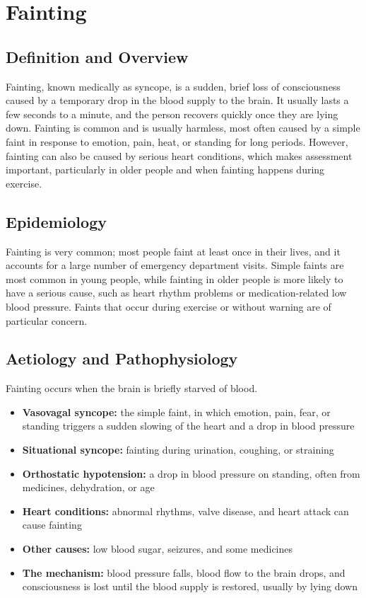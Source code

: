 \chapter{Fainting}

\section*{Definition and Overview}
Fainting, known medically as syncope, is a sudden, brief loss of consciousness caused by a temporary drop in the blood supply to the brain. It usually lasts a few seconds to a minute, and the person recovers quickly once they are lying down. Fainting is common and is usually harmless, most often caused by a simple faint in response to emotion, pain, heat, or standing for long periods. However, fainting can also be caused by serious heart conditions, which makes assessment important, particularly in older people and when fainting happens during exercise.

\section*{Epidemiology}
Fainting is very common; most people faint at least once in their lives, and it accounts for a large number of emergency department visits. Simple faints are most common in young people, while fainting in older people is more likely to have a serious cause, such as heart rhythm problems or medication-related low blood pressure. Faints that occur during exercise or without warning are of particular concern.

\section*{Aetiology and Pathophysiology}
Fainting occurs when the brain is briefly starved of blood.
\begin{itemize}
    \item \textbf{Vasovagal syncope:} the simple faint, in which emotion, pain, fear, or standing triggers a sudden slowing of the heart and a drop in blood pressure
    \item \textbf{Situational syncope:} fainting during urination, coughing, or straining
    \item \textbf{Orthostatic hypotension:} a drop in blood pressure on standing, often from medicines, dehydration, or age
    \item \textbf{Heart conditions:} abnormal rhythms, valve disease, and heart attack can cause fainting
    \item \textbf{Other causes:} low blood sugar, seizures, and some medicines
    \item \textbf{The mechanism:} blood pressure falls, blood flow to the brain drops, and consciousness is lost until the blood supply is restored, usually by lying down
\end{itemize}

